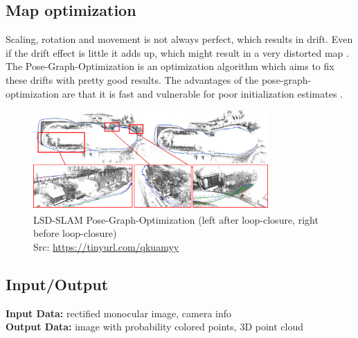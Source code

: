 \subsection{Map optimization}
Scaling, rotation and movement is not always perfect, which results in drift. Even if the drift effect is little it adds up, which might result in a very distorted map \cite{lsdslam_eccv}. The Pose-Graph-Optimization is an optimization algorithm which aims to fix these drifts with pretty good results. The advantages of the pose-graph-optimization are that it is fast and vulnerable for poor initialization estimates \cite{posegraphoptimization}. \newline

\begin{figure}[h]
	\centering
	\includegraphics[width=0.8\textwidth]{./media/images/lsd-slam-pose-graph-optimization.jpg}
  	\caption{LSD-SLAM Pose-Graph-Optimization (left after loop-closure, right before loop-closure)
  	\\Src: \url{https://tinyurl.com/qkuamyy}}
  	\label{lsd-pose-graph-optimization}
\end{figure}

\subsection{Input/Output}
\textbf{Input Data:} rectified monocular image, camera info\\
\textbf{Output Data:} image with probability colored points, 3D point cloud